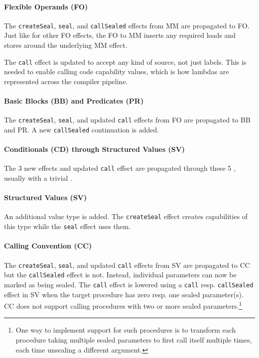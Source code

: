 \documentclass[main.tex]{subfiles}
\begin{document}
\paragraph{Flexible Operands (FO)} The \texttt{createSeal}, \texttt{seal}, and \texttt{callSealed} effects from MM are propagated to FO. Just like for other FO effects, the FO to MM  inserts any required loads and stores around the underlying MM effect.

The \texttt{call} effect is updated to accept any kind of source, not just labels. This is needed to enable calling code capability values, which is how lambdas are represented across the compiler pipeline.

\paragraph{Basic Blocks (BB) and Predicates (PR)} The \texttt{createSeal}, \texttt{seal}, and updated \texttt{call} effects from FO are propagated to BB and PR. A new \texttt{callSealed} continuation is added.

\paragraph{Conditionals (CD) through Structured Values (SV)} The 3 new effects and updated \texttt{call} effect are propagated through these 5 , usually with a trivial .

\paragraph{Structured Values (SV)} An additional  value type is added. The \texttt{createSeal} effect creates capabilities of this type while the \texttt{seal} effect uses them.

\paragraph{Calling Convention (CC)} The \texttt{createSeal}, \texttt{seal}, and updated \texttt{call} effects from SV are propagated to CC but the \texttt{callSealed} effect is not. Instead, individual parameters can now be marked as being sealed. The \texttt{call} effect is lowered using a \texttt{call} resp. \texttt{callSealed} effect in SV when the target procedure has zero resp. one sealed parameter(s). CC does not support calling procedures with two or more sealed parameters.\footnote{One way to implement support for such procedures is to transform each procedure taking multiple sealed parameters to first call itself multiple times, each time unsealing a different argument.}
\end{document}
